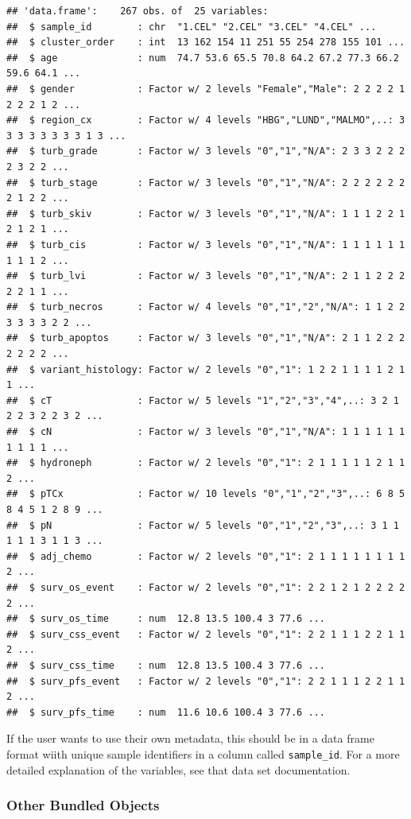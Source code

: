 \documentclass[
]{article}
\begin{document}
\begin{verbatim}
## 'data.frame':    267 obs. of  25 variables:
##  $ sample_id        : chr  "1.CEL" "2.CEL" "3.CEL" "4.CEL" ...
##  $ cluster_order    : int  13 162 154 11 251 55 254 278 155 101 ...
##  $ age              : num  74.7 53.6 65.5 70.8 64.2 67.2 77.3 66.2 59.6 64.1 ...
##  $ gender           : Factor w/ 2 levels "Female","Male": 2 2 2 2 1 2 2 2 1 2 ...
##  $ region_cx        : Factor w/ 4 levels "HBG","LUND","MALMO",..: 3 3 3 3 3 3 3 3 1 3 ...
##  $ turb_grade       : Factor w/ 3 levels "0","1","N/A": 2 3 3 2 2 2 2 3 2 2 ...
##  $ turb_stage       : Factor w/ 3 levels "0","1","N/A": 2 2 2 2 2 2 2 1 2 2 ...
##  $ turb_skiv        : Factor w/ 3 levels "0","1","N/A": 1 1 1 2 2 1 2 1 2 1 ...
##  $ turb_cis         : Factor w/ 3 levels "0","1","N/A": 1 1 1 1 1 1 1 1 1 2 ...
##  $ turb_lvi         : Factor w/ 3 levels "0","1","N/A": 2 1 1 2 2 2 2 2 1 1 ...
##  $ turb_necros      : Factor w/ 4 levels "0","1","2","N/A": 1 1 2 2 3 3 3 3 2 2 ...
##  $ turb_apoptos     : Factor w/ 3 levels "0","1","N/A": 2 1 1 2 2 2 2 2 2 2 ...
##  $ variant_histology: Factor w/ 2 levels "0","1": 1 2 2 1 1 1 1 2 1 1 ...
##  $ cT               : Factor w/ 5 levels "1","2","3","4",..: 3 2 1 2 2 3 2 2 3 2 ...
##  $ cN               : Factor w/ 3 levels "0","1","N/A": 1 1 1 1 1 1 1 1 1 1 ...
##  $ hydroneph        : Factor w/ 2 levels "0","1": 2 1 1 1 1 1 2 1 1 2 ...
##  $ pTCx             : Factor w/ 10 levels "0","1","2","3",..: 6 8 5 8 4 5 1 2 8 9 ...
##  $ pN               : Factor w/ 5 levels "0","1","2","3",..: 3 1 1 1 1 1 3 1 1 3 ...
##  $ adj_chemo        : Factor w/ 2 levels "0","1": 2 1 1 1 1 1 1 1 1 2 ...
##  $ surv_os_event    : Factor w/ 2 levels "0","1": 2 2 1 2 1 2 2 2 2 2 ...
##  $ surv_os_time     : num  12.8 13.5 100.4 3 77.6 ...
##  $ surv_css_event   : Factor w/ 2 levels "0","1": 2 2 1 1 1 2 2 1 1 2 ...
##  $ surv_css_time    : num  12.8 13.5 100.4 3 77.6 ...
##  $ surv_pfs_event   : Factor w/ 2 levels "0","1": 2 2 1 1 1 2 2 1 1 2 ...
##  $ surv_pfs_time    : num  11.6 10.6 100.4 3 77.6 ...
\end{verbatim}

If the user wants to use their own metadata, this should be in a data
frame format wiith unique sample identifiers in a column called
\texttt{sample\_id}. For a more detailed explanation of the variables,
see that data set documentation.

\subsubsection{Other Bundled Objects}\label{other-bundled-objects}
\end{document}
